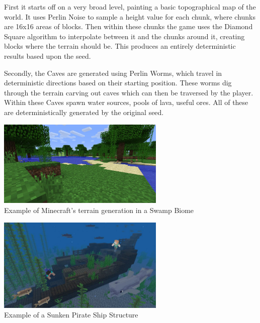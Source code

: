 \begin{flushleft}
                        \vspace{0.2cm}

                        First it starts off on a very broad level, painting a basic topographical map of the world. It uses Perlin Noise to sample
                        a height value for each chunk, where chunks are 16x16 areas of blocks. Then within these chunks the game uses the Diamond Square
                        algorithm to interpolate between it and the chunks around it, creating blocks where the terrain should be. This produces an 
                        entirely deterministic results based upon the seed.\\

                        \vspace{0.2cm}

                        Secondly, the Caves are generated using Perlin Worms, which travel in deterministic directions based on their starting position.
                        These worms dig through the terrain carving out caves which can then be traversed by the player. Within these Caves spawn water
                        sources, pools of lava, useful ores. All of these are deterministically generated by the original seed. \\ 

                        \vspace{0.2cm}
                        \begin{center}
                        \includegraphics[width=8cm]{Images/InitialResearch/MCTerrainGeneration.jpg} \\
                        Example of Minecraft's terrain generation in a Swamp Biome \\ 
                        \vspace{0.2cm}

                        \includegraphics[width=8cm]{Images/InitialResearch/MCStructureGeneration.jpg} \\ 
                        Example of a Sunken Pirate Ship Structure \\
                        \vspace{0.2cm}
                        \end{center}
                        \vspace{0.2cm}


\end{flushleft}
